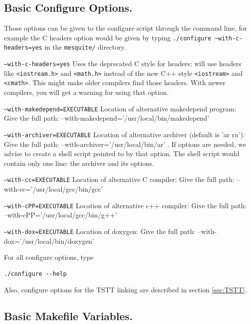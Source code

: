 \documentclass[letter]{report}
\begin{document}
\subsection{Basic Configure Options.}  \label{config_options}

Those options can be given to the configure script through the command line, for example the C headers
option would be given by typing \texttt{./configure --with-c-headers=yes} in the \texttt{mesquite/} directory.

\begin{description}
\item \texttt{--with-c-headers=yes} Uses the deprecated C style for headers:
  will use headers like \texttt{<iostream.h>} and \texttt{<math.h>}
  instead of the new C++ style \texttt{<iostream>} and \texttt{<cmath>}. This might make older
  compilers find those headers. With newer compilers, you will get a warning for using that option.
\item \texttt{--with-makedepend=EXECUTABLE} Location of alternative makedepend program:
Give the full path:  --with-makedepend='/usr/local/bin/makedepend'
\item \texttt{--with-archiver=EXECUTABLE} Location of alternative archiver (default is 'ar ru'):
Give the full path: --with-archiver='/usr/local/bin/ar' . If options are needed, we advise to
create a shell script pointed to by that option. The shell script would contain only one line: the
archiver and its options. 
\item \texttt{--with-cc=EXECUTABLE} Location of alternative C compiler:
Give the full path: --with-cc='/usr/local/gcc/bin/gcc'
\item \texttt{--with-cPP=EXECUTABLE} Location of alternative c++ compiler:
Give the full path:  --with-cPP='/usr/local/gcc/bin/g++'
\item \texttt{--with-dox=EXECUTABLE} Location of doxygen:
Give the full path: --with-dox='/usr/local/bin/doxygen'
\end{description}

For all configure options, type
\begin{verbatim}
./configure --help
\end{verbatim}
Also, configure options for the TSTT linking are described in section \ref{sec:TSTT}.



\subsection{Basic Makefile Variables.}  \label{mes_vars_and_defs}
\end{document}
